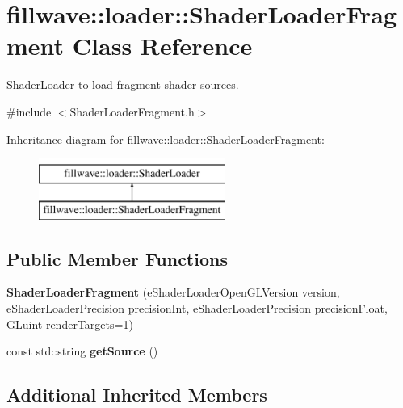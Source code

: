 \hypertarget{classfillwave_1_1loader_1_1ShaderLoaderFragment}{}\section{fillwave\+:\+:loader\+:\+:Shader\+Loader\+Fragment Class Reference}
\label{classfillwave_1_1loader_1_1ShaderLoaderFragment}


\hyperlink{classfillwave_1_1loader_1_1ShaderLoader}{Shader\+Loader} to load fragment shader sources.  




{\ttfamily \#include $<$Shader\+Loader\+Fragment.\+h$>$}

Inheritance diagram for fillwave\+:\+:loader\+:\+:Shader\+Loader\+Fragment\+:\begin{figure}[H]
\begin{center}
\leavevmode
\includegraphics[height=2.000000cm]{classfillwave_1_1loader_1_1ShaderLoaderFragment}
\end{center}
\end{figure}
\subsection*{Public Member Functions}
\begin{DoxyCompactItemize}
\item 
\hypertarget{classfillwave_1_1loader_1_1ShaderLoaderFragment_afd527a3527e25796610a51fcaa4cc8c4}{}{\bfseries Shader\+Loader\+Fragment} (e\+Shader\+Loader\+Open\+G\+L\+Version version, e\+Shader\+Loader\+Precision precision\+Int, e\+Shader\+Loader\+Precision precision\+Float, G\+Luint render\+Targets=1)\label{classfillwave_1_1loader_1_1ShaderLoaderFragment_afd527a3527e25796610a51fcaa4cc8c4}

\item 
\hypertarget{classfillwave_1_1loader_1_1ShaderLoaderFragment_adfad2179399a697195ede721a3b66263}{}const std\+::string {\bfseries get\+Source} ()\label{classfillwave_1_1loader_1_1ShaderLoaderFragment_adfad2179399a697195ede721a3b66263}

\end{DoxyCompactItemize}
\subsection*{Additional Inherited Members}


